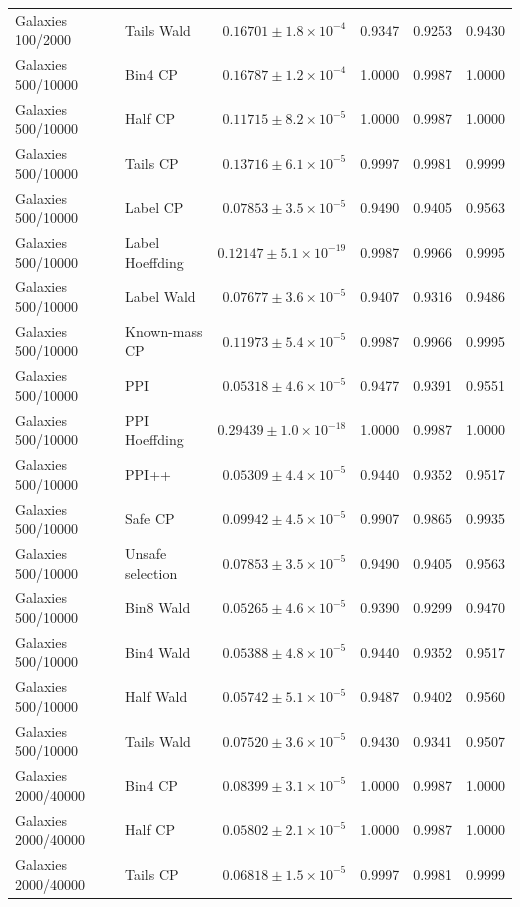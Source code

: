 \begin{longtable}{llrrrr}
Galaxies 100/2000 & Tails Wald & $0.16701\pm 1.8\times 10^{-4}$ & 0.9347 & 0.9253 & 0.9430 \\
Galaxies 500/10000 & Bin4 CP & $0.16787\pm 1.2\times 10^{-4}$ & 1.0000 & 0.9987 & 1.0000 \\
Galaxies 500/10000 & Half CP & $0.11715\pm 8.2\times 10^{-5}$ & 1.0000 & 0.9987 & 1.0000 \\
Galaxies 500/10000 & Tails CP & $0.13716\pm 6.1\times 10^{-5}$ & 0.9997 & 0.9981 & 0.9999 \\
Galaxies 500/10000 & Label CP & $0.07853\pm 3.5\times 10^{-5}$ & 0.9490 & 0.9405 & 0.9563 \\
Galaxies 500/10000 & Label Hoeffding & $0.12147\pm 5.1\times 10^{-19}$ & 0.9987 & 0.9966 & 0.9995 \\
Galaxies 500/10000 & Label Wald & $0.07677\pm 3.6\times 10^{-5}$ & 0.9407 & 0.9316 & 0.9486 \\
Galaxies 500/10000 & Known-mass CP & $0.11973\pm 5.4\times 10^{-5}$ & 0.9987 & 0.9966 & 0.9995 \\
Galaxies 500/10000 & PPI & $0.05318\pm 4.6\times 10^{-5}$ & 0.9477 & 0.9391 & 0.9551 \\
Galaxies 500/10000 & PPI Hoeffding & $0.29439\pm 1.0\times 10^{-18}$ & 1.0000 & 0.9987 & 1.0000 \\
Galaxies 500/10000 & PPI++ & $0.05309\pm 4.4\times 10^{-5}$ & 0.9440 & 0.9352 & 0.9517 \\
Galaxies 500/10000 & Safe CP & $0.09942\pm 4.5\times 10^{-5}$ & 0.9907 & 0.9865 & 0.9935 \\
Galaxies 500/10000 & Unsafe selection & $0.07853\pm 3.5\times 10^{-5}$ & 0.9490 & 0.9405 & 0.9563 \\
Galaxies 500/10000 & Bin8 Wald & $0.05265\pm 4.6\times 10^{-5}$ & 0.9390 & 0.9299 & 0.9470 \\
Galaxies 500/10000 & Bin4 Wald & $0.05388\pm 4.8\times 10^{-5}$ & 0.9440 & 0.9352 & 0.9517 \\
Galaxies 500/10000 & Half Wald & $0.05742\pm 5.1\times 10^{-5}$ & 0.9487 & 0.9402 & 0.9560 \\
Galaxies 500/10000 & Tails Wald & $0.07520\pm 3.6\times 10^{-5}$ & 0.9430 & 0.9341 & 0.9507 \\
Galaxies 2000/40000 & Bin4 CP & $0.08399\pm 3.1\times 10^{-5}$ & 1.0000 & 0.9987 & 1.0000 \\
Galaxies 2000/40000 & Half CP & $0.05802\pm 2.1\times 10^{-5}$ & 1.0000 & 0.9987 & 1.0000 \\
Galaxies 2000/40000 & Tails CP & $0.06818\pm 1.5\times 10^{-5}$ & 0.9997 & 0.9981 & 0.9999 \\

\end{longtable}

